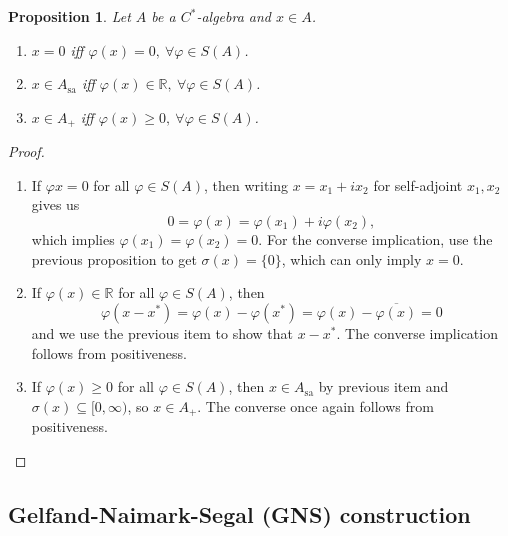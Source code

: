 \documentclass[10pt, a4paper]{article}
\newtheorem{proposition}[thm]{Proposition}
\newenvironment{noticeC}{%
  \tcolorbox[%
  notitle,
  empty,
  enhanced,  %
  breakable,
  coltext=black, 
  fontupper=\rmfamily,
  noparskip,
  sharp corners,
  boxrule=-1pt,  %
  frame hidden,
  left=7pt,  %
  right=7pt,
  top=5pt,
  bottom=5pt,
  before skip=2.5ex plus 2pt,
  after skip=2.5ex plus 2pt,
  overlay unbroken and last={%
  },
  ]}
{\endtcolorbox}
\newenvironment{myproof}%
  {\begin{noticeC}\begin{proof}}%
  {\end{proof}\end{noticeC}}
\newcommand{\R}{\mathbb {R}}
\DeclareMathOperator{\sa}{sa}
\begin{document}
\begin{proposition}\label{prop:2}
  Let $A$ be a $C^*$-algebra and $x \in A$.
  \begin{enumerate}
    \item $x = 0$ iff $\varphi (x) = 0,\ \forall \varphi \in S(A)$.
    \item $x \in A_{\sa}$ iff $\varphi (x) \in \R,\ \forall \varphi \in S(A)$.
    \item $x \in A_+$ iff $\varphi (x) \geq 0,\ \forall \varphi \in S(A)$.
  \end{enumerate}
\end{proposition}

\begin{myproof}
  \begin{enumerate}
    \item If $\varphi x = 0$ for all $\varphi \in S(A)$, then writing $x = x_1 + i x_2$
    for self-adjoint $x_1, x_2$ gives us 
    $$0 = \varphi(x) = \varphi(x_1) + i \varphi(x_2),$$
    which implies $\varphi(x_1) = \varphi(x_2) = 0$. For the converse implication,
    use the previous proposition to get $\sigma(x) = \{0\}$, which can only imply $x = 0$.
    \item If $\varphi(x) \in \R$ for all $\varphi \in S(A)$, then 
    $$\varphi(x - x^*) = \varphi(x) - \varphi(x^*) = \varphi(x) - \overline{\varphi(x)} = 0$$
    and we use the previous item to show that $x - x^*$. The converse implication follows from positiveness.
    \item If $\varphi(x) \geq 0$ for all $\varphi \in S(A)$, then $x \in A_{\sa}$
    by previous item and $\sigma(x) \subseteq [0, \infty)$, so $x \in A_+$.
    The converse once again follows from positiveness. \qedhere
  \end{enumerate}
\end{myproof}

\subsection{Gelfand-Naimark-Segal (GNS) construction}
\end{document}
